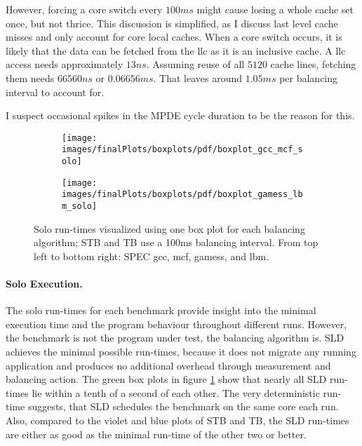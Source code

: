However, forcing a core switch every $100ms$ might cause losing a whole cache set
once, but not thrice.
This discussion is simplified, as I discuss last level cache misses
and only account for core local caches.
When a core switch occurs, it is likely that the data can be fetched from the
\gls{llc} as it is an inclusive cache.
A \gls{llc} access needs approximately $13ns$. Assuming reuse of all $5120$ cache
lines, fetching them needs $66560ns$ or  $0.06656ms$.
That leaves around $1.05ms$ per balancing interval to account for.

I suspect occasional spikes in the MPDE cycle duration to be the reason for
this.


\begin{figure}[!ht]
  \begin{subfigure}{\textwidth}
  \texttt{[image: images/finalPlots/boxplots/pdf/boxplot\_gcc\_mcf\_solo]}
  \end{subfigure}
  \begin{subfigure}{\textwidth}
  \texttt{[image: images/finalPlots/boxplots/pdf/boxplot\_gamess\_lbm\_solo]}
  \end{subfigure}
  \caption{Solo run-times visualized using one box plot for each balancing
    algorithm; STB and TB use a 100ms balancing interval.
    From top left to bottom right: SPEC gcc, mcf, gamess, and lbm.}
  \label{eval:fig:box_solo}
\end{figure}

\paragraph{Solo Execution.}
The solo run-times for each benchmark provide insight into the minimal
execution time and the program behaviour throughout different runs.
However, the benchmark is not the program under test, the balancing algorithm
is.
SLD achieves the minimal possible run-times, because it does not
migrate any running application and produces no additional overhead through
measurement and balancing action.
The green box plots in figure \ref{eval:fig:box_solo} show that nearly all SLD
run-times lie within a tenth of a second of each other.
The very deterministic run-time suggests, that SLD schedules the benchmark on
the same core each run.
Also, compared to the violet and blue plots of STB and TB, the SLD run-times
are either as good as the minimal run-time of the other two or better.
\\

